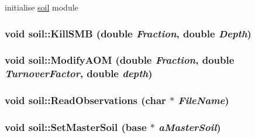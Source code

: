 initialise \hyperlink{classsoil}{soil} module \hypertarget{classsoil_a35efd012c78310446c1691c74d1a11d9}{
\subsubsection[{KillSMB}]{\setlength{\rightskip}{0pt plus 5cm}void soil::KillSMB (double {\em Fraction}, \/  double {\em Depth})}}
\label{classsoil_a35efd012c78310446c1691c74d1a11d9}
\hypertarget{classsoil_a5c180783f496514ec193625e0cd6d501}{
\subsubsection[{ModifyAOM}]{\setlength{\rightskip}{0pt plus 5cm}void soil::ModifyAOM (double {\em Fraction}, \/  double {\em TurnoverFactor}, \/  double {\em depth})}}
\label{classsoil_a5c180783f496514ec193625e0cd6d501}
\hypertarget{classsoil_ae91c861ab961ed66f0beb9cd4fd5afcc}{
\subsubsection[{ReadObservations}]{\setlength{\rightskip}{0pt plus 5cm}void soil::ReadObservations (char $\ast$ {\em FileName})}}
\label{classsoil_ae91c861ab961ed66f0beb9cd4fd5afcc}
\hypertarget{classsoil_a2f71cc22b24814c85b0a2b2c6e5c4a89}{
\subsubsection[{SetMasterSoil}]{\setlength{\rightskip}{0pt plus 5cm}void soil::SetMasterSoil ({\bf base} $\ast$ {\em aMasterSoil})}}
\label{classsoil_a2f71cc22b24814c85b0a2b2c6e5c4a89}


